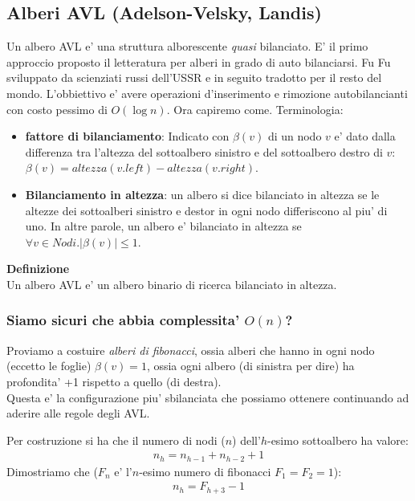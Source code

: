 \documentclass{article}
\begin{document}
\subsection{Alberi AVL (Adelson-Velsky, Landis)}

Un albero AVL e' una struttura alborescente \emph{quasi} bilanciato. E' il primo
approccio proposto il letteratura per alberi in grado di auto bilanciarsi. Fu
Fu sviluppato da scienziati russi dell'USSR e in seguito tradotto per il resto
del mondo. L'obbiettivo e' avere operazioni d'inserimento e rimozione autobilancianti
con costo pessimo di $O(\log n)$. Ora capiremo come. Terminologia:

\begin{itemize}
  \item \textbf{fattore di bilanciamento}: Indicato con $\beta(v)$ di un nodo $v$
    e' dato dalla differenza tra l'altezza del sottoalbero sinistro e del sottoalbero
    destro di $v$: $\beta(v) = altezza(v.left) - altezza(v.right)$.

  \item \textbf{Bilanciamento in altezza}: un albero si dice bilanciato in altezza
    se le altezze dei sottoalberi sinistro e destor in ogni nodo differiscono al
    piu' di uno. In altre parole, un albero e' bilanciato in altezza se
    $\forall v \in Nodi. |\beta(v)| \leq 1$.
\end{itemize}

\textbf{Definizione} \\
Un albero AVL e' un albero binario di ricerca bilanciato in altezza.

\subsubsection{Siamo sicuri che abbia complessita' $O(n)$?}

Proviamo a costuire \emph{alberi di fibonacci}, ossia alberi che hanno in ogni
nodo (eccetto le foglie) $\beta(v) = 1$, ossia ogni albero (di sinistra per dire)
ha profondita' +1 rispetto a quello (di destra). \\
Questa e' la configurazione piu' sbilanciata che possiamo ottenere continuando
ad aderire alle regole degli AVL.

Per costruzione si ha che il numero di nodi ($n$) dell'$h$-esimo sottoalbero ha valore:
\begin{align*}
  n_h = n_{h-1} + n_{h-2} + 1
\end{align*}
Dimostriamo che ($F_n$ e' l'$n$-esimo numero di fibonacci $F_1 = F_2 = 1$):
\begin{align*}
  n_h = F_{h+3} - 1
\end{align*}
\end{document}
